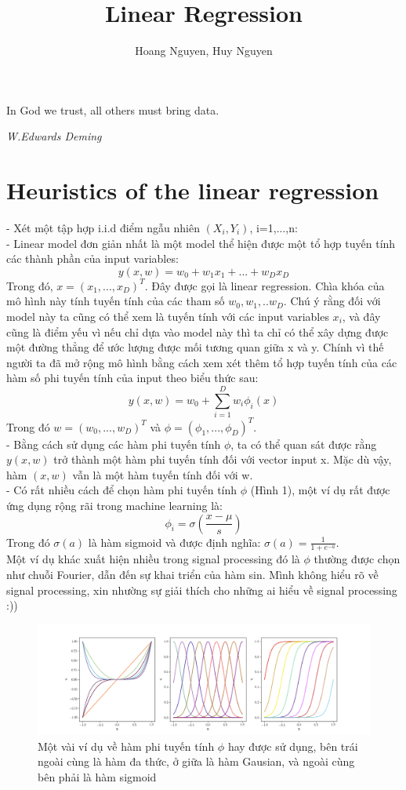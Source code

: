 \documentclass[10pt]{article}
\begin{document}
\title{Linear Regression}
\author{Hoang Nguyen, Huy Nguyen}
\maketitle

\epigraph{In God we trust, all others must bring data.}{\textit{W.Edwards Deming}}

\section{Heuristics of the linear regression}
- Xét một tập hợp i.i.d điểm ngẫu nhiên $(X_i, Y_i)$, i=1,...,n:\\
- Linear model đơn giản nhất là một model thể hiện được một tổ hợp tuyến tính   các thành phần của input variables:
\[ y(x,w) = w_0 + w_1x_1 + ... +w_Dx_D \]
Trong đó, $x = (x_1, ...,x_D)^{T}$. Đây được gọi là linear regression. Chìa khóa của mô hình này tính tuyến tính của các tham số $w_0, w_1,..w_D$. Chú ý rằng đối với model này ta cũng có thể xem là tuyến tính với các input variables $x_i$, và đây cũng là điểm yếu vì nếu chỉ dựa vào model này thì ta chỉ có thể xây dựng được một đường thẳng để ước lượng được mối tương quan giữa x và y. Chính vì thế người ta đã mở rộng mô hình bằng cách xem xét thêm tổ hợp tuyến tính của các hàm số phi tuyến tính của input theo biểu thức sau:
\[ y(x, w) = w_0 + \sum_{i=1}^{D}w_i\phi_{i}(x) \]
Trong đó $w=(w_0,...,w_{D})^{T}$ và $\phi=(\phi_1,...,\phi_{D})^{T}$.\\
- Bằng cách sử dụng các hàm phi tuyến tính $\phi$, ta có thể quan sát được rằng $y(x,w)$ trở thành một hàm phi tuyến tính đối với vector input x. Mặc dù vậy, hàm $(x,w)$ vẫn là một hàm tuyến tính đối với w.\\
- Có rất nhiều cách để chọn hàm phi tuyến tính $\phi$ (Hình 1), một ví dụ rất được ứng dụng rộng rãi trong machine learning là:
\[ \phi_{i}=\sigma(\frac{x-\mu}{s}) \]
Trong đó $\sigma(a)$ là hàm sigmoid và được định nghĩa: $\sigma(a) = \frac{1}{1 + e^{-a}}$.\\
Một ví dụ khác xuất hiện nhiều trong signal processing đó là $\phi$ thường được chọn như chuỗi Fourier, dẫn đến sự khai triển của hàm sin. Mình không hiểu rõ về signal processing, xin nhường sự giải thích cho những ai hiểu về signal processing :))
\begin{figure}
  \includegraphics[width=\linewidth]{kernel.png}
  \caption{Một vài ví dụ về hàm phi tuyến tính $\phi$ hay được sử dụng, bên trái ngoài cùng là hàm đa thức, ở giữa là hàm Gausian, và ngoài cùng bên phải là hàm sigmoid}
  \label{fig:boat1}
\end{figure}
\end{document}
